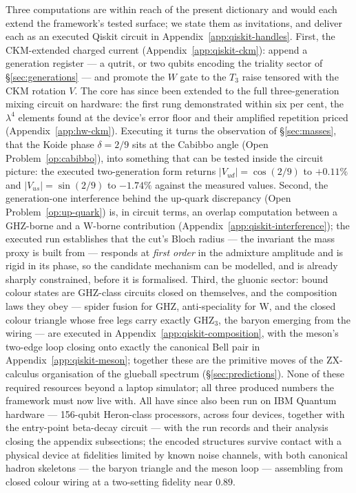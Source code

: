 Three computations are within reach of the present dictionary and would each extend the framework's
tested surface; we state them as invitations, and deliver each as an executed Qiskit circuit in
Appendix~\ref{app:qiskit-handles}. First, the CKM-extended charged current
(Appendix~\ref{app:qiskit-ckm}): append a
generation register --- a qutrit, or two qubits encoding the triality sector of
\S\ref{sec:generations} --- and promote the $W$ gate to the $T_3$ raise tensored with the CKM
rotation $V$. The core has since been extended to the full three-generation mixing circuit on hardware:
the first rung demonstrated within six per cent, the $\lambda^{4}$ elements found at the
device's error floor and their amplified repetition priced (Appendix~\ref{app:hw-ckm}). Executing it turns the observation of \S\ref{sec:masses}, that the Koide phase
$\delta = 2/9$ sits at the Cabibbo angle (Open Problem~\ref{op:cabibbo}), into something that can be
tested inside the circuit picture: the executed two-generation form returns
$\lvert V_{ud}\rvert = \cos(2/9)$ to $+0.11\%$ and $\lvert V_{us}\rvert = \sin(2/9)$ to $-1.74\%$
against the measured values. Second, the generation-one interference
behind the up-quark discrepancy (Open Problem~\ref{op:up-quark}) is, in circuit terms, an overlap
computation between a GHZ-borne and a W-borne contribution
(Appendix~\ref{app:qiskit-interference}); the executed run establishes that the cut's Bloch radius
--- the invariant the mass proxy is built from --- responds at \emph{first order} in the admixture
amplitude and is rigid in its phase, so the candidate mechanism can be modelled, and is already
sharply constrained, before it is formalised. Third, the gluonic sector: bound colour states are
GHZ-class circuits closed on themselves, and the composition laws they obey --- spider fusion for
GHZ, anti-speciality for W, and the closed colour triangle whose free legs carry exactly
$\mathrm{GHZ}_3$, the baryon emerging from the wiring --- are executed in
Appendix~\ref{app:qiskit-composition}, with the meson's two-edge loop closing onto exactly the
canonical Bell pair in Appendix~\ref{app:qiskit-meson}; together these are the
primitive moves of the ZX-calculus organisation of the
glueball spectrum (\S\ref{sec:predictions}). None of these required resources beyond a laptop
simulator; all three produced numbers the framework must now live with. All have since also
been run on IBM Quantum hardware --- 156-qubit Heron-class processors, across four devices, together
with the entry-point beta-decay circuit --- with the run records and their analysis closing the
appendix subsections; the encoded structures survive contact with a physical device at fidelities
limited by known noise channels, with both canonical hadron skeletons --- the baryon triangle and
the meson loop --- assembling from closed colour wiring at a two-setting fidelity near $0.89$.

